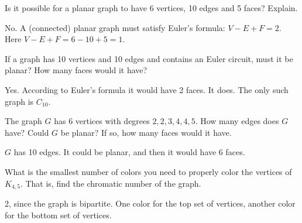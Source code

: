 \begin{questions}
	
	


\question Is it possible for a planar graph to have 6 vertices, 10 edges and 5 faces?  Explain.

	\begin{answer}
		No.  A (connected) planar graph must satisfy Euler's formula: $V - E + F = 2$.  Here $V - E + F = 6 - 10 + 5 = 1$. %
	\end{answer}
	
	
	


\question If a graph has 10 vertices and 10 edges and contains an Euler circuit, must it be planar?  How many faces would it have?

	\begin{answer}
		Yes.  According to Euler's formula it would have 2 faces.  It does.  The only such graph is $C_{10}$. %
	\end{answer}
	
	
	


\question The graph $G$ has 6 vertices with degrees $2, 2, 3, 4, 4, 5$.  How many edges does $G$ have?  Could $G$ be planar?  If so, how many faces would it have.

	\begin{answer}
		$G$ has 10 edges.  It could be planar, and then it would have 6 faces. %
	\end{answer}
	
	
	


\question What is the smallest number of colors you need to properly color the vertices of $K_{4,5}$.  That is, find the chromatic number of the graph.

	\begin{answer}
		2, since the graph is bipartite.  One color for the top set of vertices, another color for the bottom set of vertices.  %
	\end{answer}
	
	
	



\end{questions}
